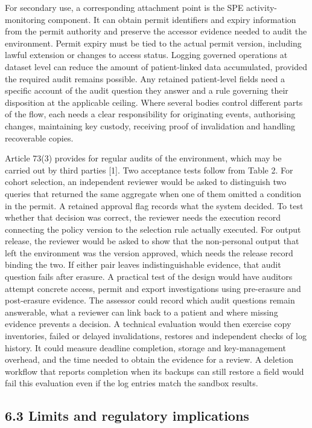 \documentclass[preprint,review,12pt]{elsarticle}
\begin{document}
For secondary use, a corresponding attachment point is the SPE
activity-monitoring component. It can obtain permit identifiers and
expiry information from the permit authority and preserve the accessor
evidence needed to audit the environment. Permit expiry must be tied to
the actual permit version, including lawful extension or changes to
access status. Logging governed operations at dataset level can reduce
the amount of patient-linked data accumulated, provided the required
audit remains possible. Any retained patient-level fields need a
specific account of the audit question they answer and a rule governing
their disposition at the applicable ceiling. Where several bodies
control different parts of the flow, each needs a clear responsibility
for originating events, authorising changes, maintaining key custody,
receiving proof of invalidation and handling recoverable copies.

Article 73(3) provides for regular audits of the environment, which may
be carried out by third parties {[}1{]}. Two acceptance tests follow
from Table 2. For cohort selection, an independent reviewer would be
asked to distinguish two queries that returned the same aggregate when
one of them omitted a condition in the permit. A retained approval flag
records what the system decided. To test whether that decision was
correct, the reviewer needs the execution record connecting the policy
version to the selection rule actually executed. For output release, the
reviewer would be asked to show that the non-personal output that left
the environment was the version approved, which needs the release record
binding the two. If either pair leaves indistinguishable evidence, that
audit question fails after erasure. A practical test of the design would
have auditors attempt concrete access, permit and export investigations
using pre-erasure and post-erasure evidence. The assessor could record
which audit questions remain answerable, what a reviewer can link back
to a patient and where missing evidence prevents a decision. A technical
evaluation would then exercise copy inventories, failed or delayed
invalidations, restores and independent checks of log history. It could
measure deadline completion, storage and key-management overhead, and
the time needed to obtain the evidence for a review. A deletion workflow
that reports completion when its backups can still restore a field would
fail this evaluation even if the log entries match the sandbox results.

\hypertarget{limits-and-regulatory-implications}{%
\subsection{6.3 Limits and regulatory
implications}\label{limits-and-regulatory-implications}}
\end{document}
